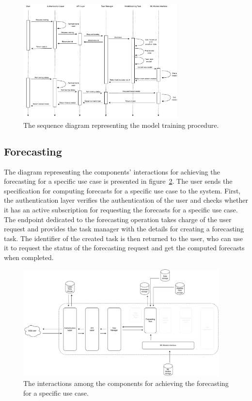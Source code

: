 \begin{figure}[H]
\centering
\includegraphics[width=0.75\textwidth]{images/architecture_training_sequence}
\caption{The sequence diagram representing the model training procedure.}
\label{fig:trainingsequence}
\end{figure}


\vspace{0.1 cm}
\subsection{Forecasting}
\label{sec:forecasting}
\vspace{0.1 cm}

The diagram representing the components' interactions for achieving the forecasting for a specific use case is presented in figure~\ref{fig:forecastinginteractions}.
The user sends the specification for computing forecasts for a specific use case to the system.
First, the authentication layer verifies the authentication of the user and checks whether it has an active subscription for requesting the forecasts for a specific use case.
The endpoint dedicated to the forecasting operation takes charge of the user request and provides the task manager with the details for creating a forecasting task.
The identifier of the created task is then returned to the user, who can use it to request the status of the forecasting request and get the computed forecasts when completed.

\begin{figure}[H]
\centering
\includegraphics[width=0.95\textwidth]{images/architecture_forecasting_interactions}
\caption{The interactions among the components for achieving the forecasting for a specific use case.}
\label{fig:forecastinginteractions}
\end{figure}

